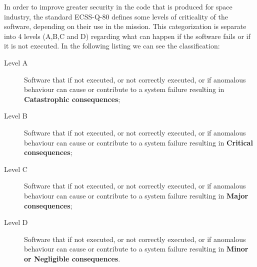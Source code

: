 In order to improve greater security in the code that is produced for space industry, the standard ECSS-Q-80\cite{ecss-q-st-80c} defines
some levels of criticality of the software, depending on their use in the mission.
This categorization is separate into 4 levels (A,B,C and D) regarding what can happen if the software fails or if it is not executed.
In the following listing we can see the classification:

\begin{description}
\item[Level A] Software that if not executed, or not correctly executed, or if anomalous behaviour can cause or contribute to a system failure resulting in \textbf{Catastrophic consequences};
\item[Level B] Software that if not executed, or not correctly executed, or if anomalous behaviour can cause or contribute to a system failure resulting in \textbf{Critical consequences};
\item[Level C] Software that if not executed, or not correctly executed, or if anomalous behaviour can cause or contribute to a system failure resulting in \textbf{Major consequences};
\item[Level D] Software that if not executed, or not correctly executed, or if anomalous behaviour can cause or contribute to a system failure resulting in \textbf{Minor or Negligible consequences}.
\end{description}

